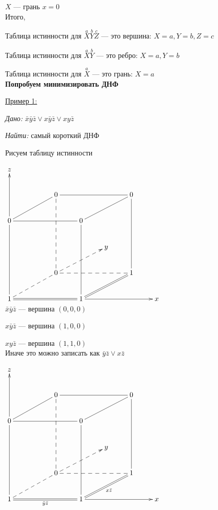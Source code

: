 \documentclass[a4paper, 12pt] {article}
\begin{document}
$ X $ --- грань $ x =0 $\\

Итого, 

Таблица истинности для $ \stackrel{a}{X} \stackrel{b}{Y} \stackrel{c}{Z} $ --- это вершина: $ X =a, Y =b, Z =c $

Таблица истинности для $ \stackrel{a}{X} \stackrel{b}{Y} $ --- это ребро: $ X =a, Y =b$

Таблица истинности для $ \stackrel{a}{X} $ --- это грань: $ X =a$\\

\textbf{Попробуем минимизировать ДНФ}

\underline{Пример 1:}

\textit{Дано:} $ \bar x \bar y \bar z \vee  x \bar y \bar z \vee  x  y \bar z $

\textit{Найти:} самый короткий ДНФ

Рисуем таблицу истинности 

$ 
\begin{matrix}
	\xymatrix{
		z &   &  &   & & &\\
		&   & 0 \ar@{-}[lld] \ar@{--}[ddd] &   & & 0 \ar@{-}[lld] \ar@{-}[lll]&\\
		0 \ar@{->}[uu] \ar@{-}[rrr] &   &  & 0  & & &\\
		&   &  &   & y & &\\
		&   & 0 \ar@{--}[lld] \ar@{-->}[rru] \ar@{--}[rrr] &   & & 1 \ar@{-}[uuu]  &\\
		1  \ar@{-}[uuu] \ar@{=}[rrr] & & & 1 \ar@{->}[rrr] \ar@{-}[uuu] \ar@{=}[rru] & & & x \\
	}
\end{matrix}
$\\

$ \bar x \bar y \bar z $ --- вершина $ (0,0,0) $

$  x \bar y \bar z $ --- вершина $ (1,0,0) $

$  x  y \bar z $ --- вершина $ (1,1,0) $\\

Иначе это можно записать как $ \bar y \bar z \vee x \bar z $

$ 
\begin{matrix}
	\xymatrix{
		z &   &  &   & & &\\
		&   & 0 \ar@{-}[lld] \ar@{--}[ddd] &   & & 0 \ar@{-}[lld] \ar@{-}[lll]&\\
		0 \ar@{->}[uu] \ar@{-}[rrr] &   &  & 0  & & &\\
		&   &  &   & y & &\\
		&   & 0 \ar@{--}[lld] \ar@{-->}[rru] \ar@{--}[rrr] &   & & 1 \ar@{-}[uuu]  &\\
		1  \ar@{-}[uuu] \ar@{=}[rrr]_{\bar y \bar z} & & & 1 \ar@{->}[rrr] \ar@{-}[uuu] \ar@{=}[rru]_{x \bar z} & & & x \\
	}
\end{matrix}
$\\
\end{document}
